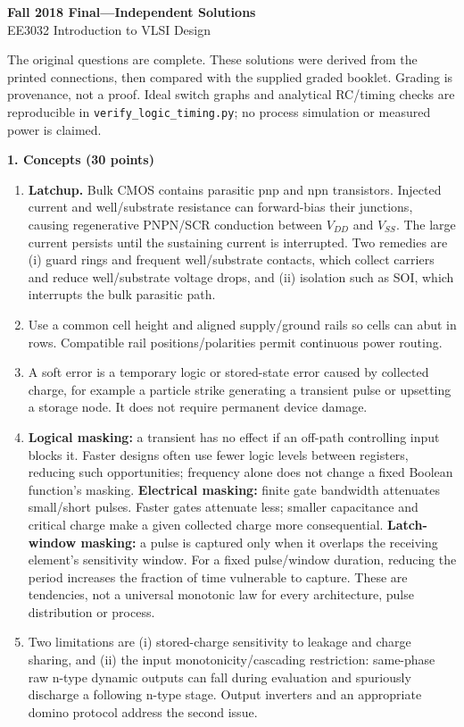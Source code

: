 \documentclass[10pt]{article}
\newcommand{\qheading}[1]{\par\medskip\textbf{#1}\par}
\begin{document}
\begin{center}{\Large\bfseries Fall 2018 Final---Independent Solutions}\\EE3032 Introduction to VLSI Design\end{center}
The original questions are complete. These solutions were derived from the printed connections, then compared with the supplied graded booklet. Grading is provenance, not a proof. Ideal switch graphs and analytical RC/timing checks are reproducible in \texttt{verify\_logic\_timing.py}; no process simulation or measured power is claimed.
\qheading{1. Concepts (30 points)}
\begin{enumerate}[label=(\alph*),leftmargin=7mm]
\item \textbf{Latchup.} Bulk CMOS contains parasitic pnp and npn transistors. Injected current and well/substrate resistance can forward-bias their junctions, causing regenerative PNPN/SCR conduction between $V_{DD}$ and $V_{SS}$. The large current persists until the sustaining current is interrupted. Two remedies are (i) guard rings and frequent well/substrate contacts, which collect carriers and reduce well/substrate voltage drops, and (ii) isolation such as SOI, which interrupts the bulk parasitic path.
\item Use a common cell height and aligned supply/ground rails so cells can abut in rows. Compatible rail positions/polarities permit continuous power routing.
\item A soft error is a temporary logic or stored-state error caused by collected charge, for example a particle strike generating a transient pulse or upsetting a storage node. It does not require permanent device damage.
\item \textbf{Logical masking:} a transient has no effect if an off-path controlling input blocks it. Faster designs often use fewer logic levels between registers, reducing such opportunities; frequency alone does not change a fixed Boolean function's masking. \textbf{Electrical masking:} finite gate bandwidth attenuates small/short pulses. Faster gates attenuate less; smaller capacitance and critical charge make a given collected charge more consequential. \textbf{Latch-window masking:} a pulse is captured only when it overlaps the receiving element's sensitivity window. For a fixed pulse/window duration, reducing the period increases the fraction of time vulnerable to capture. These are tendencies, not a universal monotonic law for every architecture, pulse distribution or process.
\item Two limitations are (i) stored-charge sensitivity to leakage and charge sharing, and (ii) the input monotonicity/cascading restriction: same-phase raw n-type dynamic outputs can fall during evaluation and spuriously discharge a following n-type stage. Output inverters and an appropriate domino protocol address the second issue.

\end{enumerate}
\end{document}

